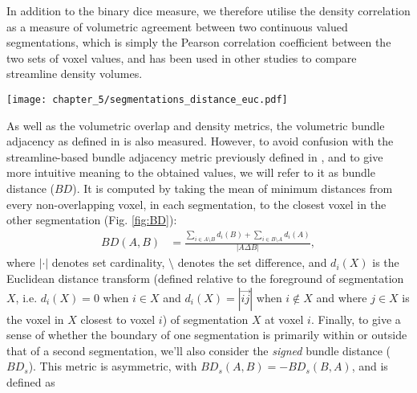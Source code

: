 In addition to the binary \gls{dice} measure, we therefore utilise the density correlation as a measure of volumetric agreement between two continuous valued segmentations, which is simply the Pearson correlation coefficient between the two sets of voxel values, and has been used in other studies to compare streamline density volumes\autocite{Radwan2022, Schilling2021a}.

\begin{SCfigure}[50][htbp!]
  \centering
  \texttt{[image: chapter\_5/segmentations\_distance\_euc.pdf]}
  \caption[Bundle distance calculation]{Illustration of regions involved in calculating the bundle distance metric. The light grey area is $A\setminus B$, dark grey is $B\setminus A$, and in each grey voxel is written its minimum Euclidean distance to the black intersection. Distance sign is negative outside of the reference segmentation ($B$ in this example) and positive inside. To compute the bundle distance $BD(A,B)$ (Eq. \ref{eq:bd}), the mean minimum absolute distance is taken across all 17 voxels in the two grey areas $BD(A,B) = (14+4\sqrt{2}+3\sqrt{5})/17 = 1.55$. To compute the signed bundle distance $BD_s(A,B)$ (Eq. \ref{eq:bds}), the signed distances relative to the reference set $B$ are used: $BD_s(A,B) = (2-2\sqrt{2}-\sqrt{5})/17 = -0.18$. The \gls{dice} for these two segmentations would be $DSC = 2*4/(13+12) = 0.32$}
  \label{fig:BD}
\end{SCfigure}

As well as the volumetric overlap and density metrics, the volumetric bundle adjacency as defined in \textcite{Schilling2021a} is also measured.
However, to avoid confusion with the streamline-based bundle adjacency\autocite{Radwan2022, Garyfallidis2012, Rheault2022} metric previously defined in \textcite{Garyfallidis2012},
and to give more intuitive meaning to the obtained values, we will refer to it as bundle distance ($BD$).
It is computed by taking the mean of minimum distances from every non-overlapping voxel, in each segmentation, to the closest voxel in the other segmentation (Fig. \ref{fig:BD}):
\begin{align}
  BD(A,B) &= \frac{\sum_{i \in A\setminus B} d_i(B) + \sum_{i \in B\setminus A} d_i(A)}{|A\Delta B|} \label{eq:bd},
\end{align}
where $| \cdot |$ denotes set cardinality, $\setminus$ denotes the set difference, and $d_i(X)$ is the Euclidean distance transform (defined relative to the foreground of segmentation $X$, i.e. $d_i(X) = 0$ when $i \in X $ and $d_i(X) = |\overrightarrow{ij}|$ when $i \not\in X$ and where $j \in X$ is the voxel in $X$ closest to voxel $i$)  of segmentation $X$ at voxel $i$.
Finally, to give a sense of whether the boundary of one segmentation is primarily within or outside that of a second segmentation, we'll also consider the \textit{signed} bundle distance ($BD_s$).
This metric is asymmetric, with $BD_s (A,B) = -BD_s(B,A)$, and is defined as

